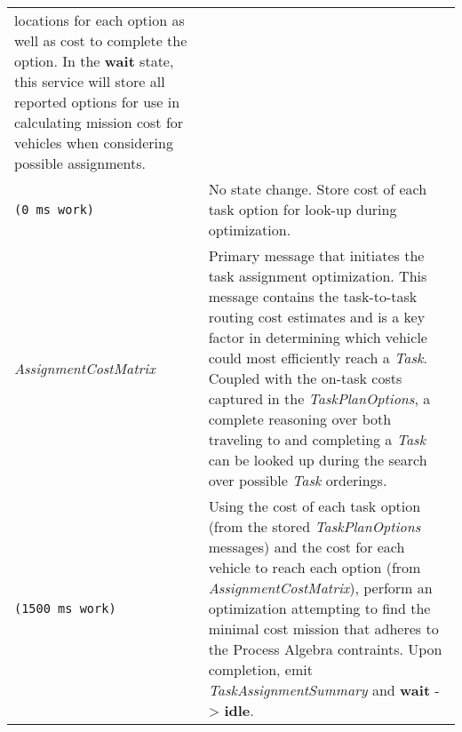 \begin{longtable}[c]{@{}ll@{}}
\begin{minipage}[t]{0.65\columnwidth}
locations for each option as well as cost to complete the option. In the
\textbf{wait} state, this service will store all reported options for
use in calculating mission cost for vehicles when considering possible
assignments.
\strut\end{minipage}\tabularnewline
\begin{minipage}[t]{0.29\columnwidth}\raggedright\strut
\begin{verbatim}
(0 ms work)
\end{verbatim}
\strut\end{minipage} &
\begin{minipage}[t]{0.65\columnwidth}\raggedright\strut
No state change. Store cost of each task option for look-up during
optimization.
\strut\end{minipage}\tabularnewline
\begin{minipage}[t]{0.29\columnwidth}\raggedright\strut
\emph{AssignmentCostMatrix}
\strut\end{minipage} &
\begin{minipage}[t]{0.65\columnwidth}\raggedright\strut
Primary message that initiates the task assignment optimization. This
message contains the task-to-task routing cost estimates and is a key
factor in determining which vehicle could most efficiently reach a
\emph{Task}. Coupled with the on-task costs captured in the
\emph{TaskPlanOptions}, a complete reasoning over both traveling to and
completing a \emph{Task} can be looked up during the search over
possible \emph{Task} orderings.
\strut\end{minipage}\tabularnewline
\begin{minipage}[t]{0.29\columnwidth}\raggedright\strut
\begin{verbatim}
(1500 ms work)
\end{verbatim}
\strut\end{minipage} &
\begin{minipage}[t]{0.65\columnwidth}\raggedright\strut
Using the cost of each task option (from the stored
\emph{TaskPlanOptions} messages) and the cost for each vehicle to reach
each option (from \emph{AssignmentCostMatrix}), perform an optimization
attempting to find the minimal cost mission that adheres to the Process
Algebra contraints. Upon completion, emit \emph{TaskAssignmentSummary}
and \textbf{wait} -\textgreater{} \textbf{idle}.
\strut\end{minipage}\tabularnewline
\bottomrule
\end{longtable}

